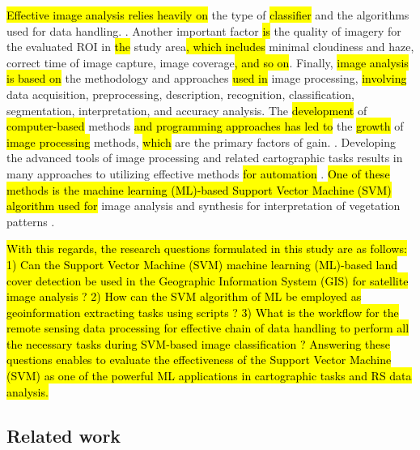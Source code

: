 \documentclass[earth,article,submit,pdftex,moreauthors]{Definitions/mdpi}
\begin{document}
\hl{Effective image analysis relies heavily on} the type of \hl{classifier} and the algorithms used for data handling. \cite{Lemenkova202212}. Another important factor \hl{is} the quality of imagery for the evaluated ROI in \hl{the} study area\hl{, which includes} minimal cloudiness and haze, correct time of image capture, image coverage\hl{, and so on}. Finally, \hl{image analysis is based on} the methodology and approaches \hl{used in} image processing, \hl{involving} data acquisition, preprocessing, description, recognition, classification, segmentation, interpretation, and accuracy analysis. The \hl{development} of \hl{computer-based} methods \hl{and programming approaches has led to} the \hl{growth} of \hl{image processing} methods, \hl{which} are the primary factors of gain. \cite{Duncan,jimaging9050098,Purkis,info14040249,DIOUF2001129}. Developing the advanced tools of image processing and related cartographic tasks results in many approaches to utilizing effective methods \hl{for automation} \cite{SUOMALAINEN2021112691,OlsonAnderson,Lemenkova202227,Ali,Olsonetal2019,Lemenkova202229}. \hl{One of these methods is the machine learning (ML)-based Support Vector Machine (SVM) algorithm used for} image analysis and synthesis for interpretation of vegetation patterns \cite{PUERTAS2013112,PETROPOULOS201170,ANEES2024102732,IBRAHIM2024100561}.

\hl{With this regards, the research questions formulated in this study are as follows: 1) Can the Support Vector Machine (SVM) machine learning (ML)-based land cover detection be used in the Geographic Information System (GIS) for satellite image analysis ? 2) How can the SVM algorithm of ML be employed as geoinformation extracting tasks using scripts ? 3) What is the workflow for the remote sensing data processing for effective chain of data handling to perform all the necessary tasks during SVM-based image classification ? Answering these questions enables to evaluate the effectiveness of the Support Vector Machine (SVM) as one of the powerful ML applications in cartographic tasks and RS data analysis.}

\subsection{Related work}
\end{document}
